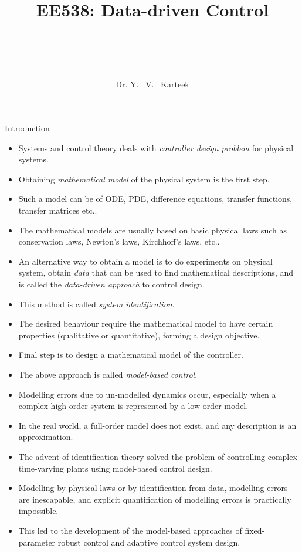 \documentclass[hyperref={pdfpagemode=FullScreen},aspectratio=169]{beamer}
\title{\Large{EE538: Data-driven Control\\~\\}~\\}
\author{\small Dr. Y. ~V. ~Karteek}
\date{}
\begin{document}
\begin{frame}[plain]
          \begin{center}
                    \Large{}
                    \end{center}
               \titlepage
        \end{frame}
\begin{frame}{Introduction}
\begin{itemize}
\setlength\itemsep{1em}
\item Systems and control theory deals with \textit{controller design problem} for physical systems.
\item Obtaining \textit{mathematical model} of the physical system is the first step.
\item Such a model can be of ODE, PDE, difference equations, transfer functions, transfer matrices etc..
\item The mathematical models are usually based on basic physical laws such as conservation laws, Newton's laws, Kirchhoff's laws, etc..
\item An alternative way to obtain a model is to do experiments on physical system, obtain \textit{data} that can be used to find mathematical descriptions, and is called the \textit{data-driven approach} to control
design.
\item This method is called \textit{system identification}.
\item The desired behaviour require the mathematical model to have certain properties (qualitative or quantitative), forming a design objective.
\end{itemize}
\end{frame}
\begin{frame}{}
\begin{itemize}
\setlength\itemsep{1em}
\item Final step is to design a mathematical model of the controller.
\item The above approach is called \textit{model-based control}.
\item Modelling errors due to un-modelled dynamics occur, especially when a complex high order system is represented by a low-order model.
\item In the real world, a full-order model does not exist, and any description is an approximation.
\item The advent of identification theory solved the problem of controlling complex time-varying plants using model-based control design.
\item Modelling by physical laws or by identification from data, modelling errors are inescapable, and explicit quantification of modelling errors is practically impossible.
\item This led to the development of the model-based approaches of fixed-parameter robust control and adaptive control system design.
\end{itemize}
\end{frame}
\end{document}

